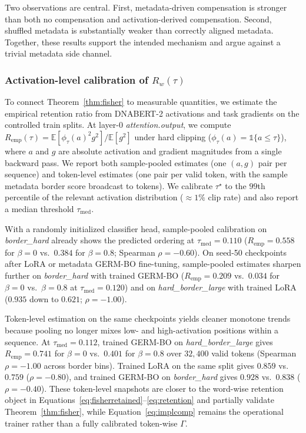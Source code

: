 \documentclass[12pt,letterpaper]{article}
\newcommand{\splitname}[1]{\textit{#1}}
\newcommand{\modpath}[1]{\textit{#1}}
\begin{document}
Two observations are central. First, metadata-driven compensation is stronger than both no compensation and activation-derived compensation. Second, shuffled metadata is substantially weaker than correctly aligned metadata. Together, these results support the intended mechanism and argue against a trivial metadata side channel.

\subsubsection*{Activation-level calibration of $R_w(\tau)$}

To connect Theorem~\ref{thm:fisher} to measurable quantities, we estimate the empirical retention ratio from DNABERT-2 activations and task gradients on the controlled train splits. At layer-0 \modpath{attention.output}, we compute $R_{\mathrm{emp}}(\tau)=\mathbb{E}[\phi_{\tau}(a)^2 g^2]/\mathbb{E}[g^2]$ under hard clipping ($\phi_{\tau}(a)=\mathbb{1}\{a\le \tau\}$), where $a$ and $g$ are absolute activation and gradient magnitudes from a single backward pass. We report both sample-pooled estimates (one $(a,g)$ pair per sequence) and token-level estimates (one pair per valid token, with the sample metadata border score broadcast to tokens). We calibrate $\tau^{\star}$ to the $99$th percentile of the relevant activation distribution ($\approx 1\%$ clip rate) and also report a median threshold $\tau_{\mathrm{med}}$.

With a randomly initialized classifier head, sample-pooled calibration on \splitname{border\_hard} already shows the predicted ordering at $\tau_{\mathrm{med}}=0.110$ ($R_{\mathrm{emp}}=0.558$ for $\beta=0$ vs.\ $0.384$ for $\beta=0.8$; Spearman $\rho=-0.60$). On seed-50 checkpoints after LoRA or metadata GERM-BO fine-tuning, sample-pooled estimates sharpen further on \splitname{border\_hard} with trained GERM-BO ($R_{\mathrm{emp}}=0.209$ vs.\ $0.034$ for $\beta=0$ vs.\ $\beta=0.8$ at $\tau_{\mathrm{med}}=0.120$) and on \splitname{hard\_border\_large} with trained LoRA ($0.935$ down to $0.621$; $\rho=-1.00$).

Token-level estimation on the same checkpoints yields cleaner monotone trends because pooling no longer mixes low- and high-activation positions within a sequence. At $\tau_{\mathrm{med}}=0.112$, trained GERM-BO on \splitname{hard\_border\_large} gives $R_{\mathrm{emp}}=0.741$ for $\beta=0$ vs.\ $0.401$ for $\beta=0.8$ over $32{,}400$ valid tokens (Spearman $\rho=-1.00$ across border bins). Trained LoRA on the same split gives $0.859$ vs.\ $0.759$ ($\rho=-0.80$), and trained GERM-BO on \splitname{border\_hard} gives $0.928$ vs.\ $0.838$ ($\rho=-0.40$). These token-level snapshots are closer to the word-wise retention object in Equations~\eqref{eq:fisherretained}--\eqref{eq:retention} and partially validate Theorem~\ref{thm:fisher}, while Equation~\eqref{eq:implcomp} remains the operational trainer rather than a fully calibrated token-wise $\Gamma$.
\end{document}
